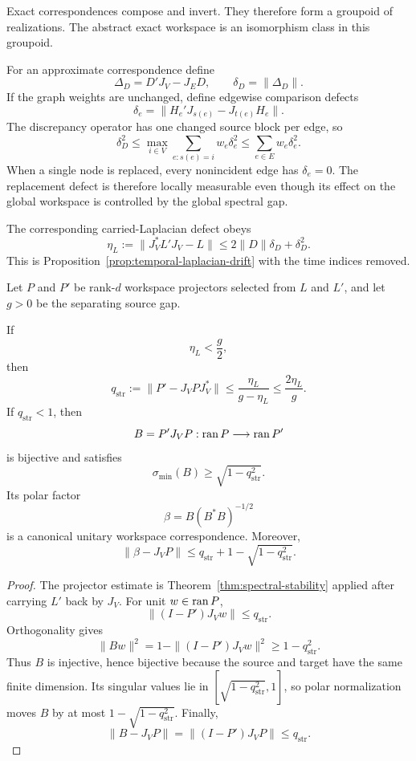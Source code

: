 Exact correspondences compose and invert. They therefore form a groupoid of
realizations. The abstract exact workspace is an isomorphism class in this
groupoid.


For an approximate correspondence define
\[
\boxed{
\Delta_D=D'J_V-J_ED,
\qquad
\delta_D=\|\Delta_D\|.
}
\]
If the graph weights are unchanged, define edgewise comparison defects
\[
\delta_e
=
\|H_e'J_{s(e)}-J_{t(e)}H_e\|.
\]
The discrepancy operator has one changed source block per edge, so
\[
\boxed{
\delta_D^2
\leq
\max_{i\in V}
\sum_{e:s(e)=i}w_e\delta_e^2
\leq
\sum_{e\in E}w_e\delta_e^2.
}
\]
When a single node is replaced, every nonincident edge has \(\delta_e=0\).
The replacement defect is therefore locally measurable even though its effect
on the global workspace is controlled by the global spectral gap.

The corresponding carried-Laplacian defect obeys
\[
\boxed{
\eta_L
:=
\|J_V^*L'J_V-L\|
\leq
2\|D\|\delta_D+\delta_D^2.
}
\]
This is Proposition~\ref{prop:temporal-laplacian-drift} with the time indices
removed.

Let \(P\) and \(P'\) be rank-\(d\) workspace projectors selected from \(L\)
and \(L'\), and let \(g>0\) be the separating source gap.

\begin{theorem}\label{thm:approx-structural-replacement}
If
\[
\eta_L<\frac g2,
\]
then
\[
\boxed{
q_{\mathrm{str}}
:=
\|P'-J_VPJ_V^*\|
\leq
\frac{\eta_L}{g-\eta_L}
\leq
\frac{2\eta_L}{g}.
}
\]
If \(q_{\mathrm{str}}<1\), then
\[
B=P'J_VP:\operatorname{ran} P\longrightarrow\operatorname{ran} P'
\]
is bijective and satisfies
\[
\sigma_{\min}(B)
\geq
\sqrt{1-q_{\mathrm{str}}^2}.
\]
Its polar factor
\[
\boxed{
\beta
=B(B^*B)^{-1/2}
}
\]
is a canonical unitary workspace correspondence. Moreover,
\[
\boxed{
\|\beta-J_VP\|
\leq
q_{\mathrm{str}}
+
1-\sqrt{1-q_{\mathrm{str}}^2}.
}
\]
\end{theorem}

\begin{proof}
The projector estimate is Theorem~\ref{thm:spectral-stability} applied after
carrying \(L'\) back by \(J_V\). For unit \(w\in\operatorname{ran} P\),
\[
\|(I-P')J_Vw\|
\leq q_{\mathrm{str}}.
\]
Orthogonality gives
\[
\|Bw\|^2
=1-\|(I-P')J_Vw\|^2
\geq1-q_{\mathrm{str}}^2.
\]
Thus \(B\) is injective, hence bijective because the source and target have
the same finite dimension. Its singular values lie in
\([\sqrt{1-q_{\mathrm{str}}^2},1]\), so polar normalization moves \(B\) by at
most \(1-\sqrt{1-q_{\mathrm{str}}^2}\). Finally,
\[
\|B-J_VP\|=\|(I-P')J_VP\|\leq q_{\mathrm{str}}.
\]
\end{proof}

